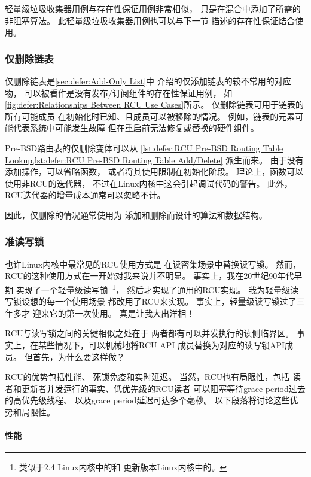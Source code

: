 轻量级垃圾收集器用例与存在性保证用例非常相似，
只是在混合中添加了所需的非阻塞算法。
此轻量级垃圾收集器用例也可以与下一节
描述的存在性保证结合使用。

\subsubsection{仅删除链表}
\label{sec:defer:Delete-Only List}

仅删除链表是\cref{sec:defer:Add-Only List}中
介绍的仅添加链表的较不常用的对应物，
可以被看作是没有发布/订阅组件的存在性保证用例，
如\cref{fig:defer:Relationships Between RCU Use Cases}所示。
仅删除链表可用于链表的所有可能成员
在初始化时已知、且成员可以被移除的情况。
例如，链表的元素可能代表系统中可能发生故障
但在重启前无法修复或替换的硬件组件。

Pre-BSD路由表的仅删除变体可以从
\cref{lst:defer:RCU Pre-BSD Routing Table Lookup,lst:defer:RCU Pre-BSD Routing Table Add/Delete}
派生而来。
由于没有添加操作，可以省略函数，
或者将其使用限制在初始化阶段。
理论上，函数可以使用非RCU的迭代器，
不过在Linux内核中这会引起调试代码的警告。
此外，RCU迭代器的增量成本通常可以忽略不计。

因此，仅删除的情况通常使用为
添加和删除而设计的算法和数据结构。

\subsubsection{准读写锁}
\label{sec:defer:Quasi Reader-Writer Lock}

也许Linux内核中最常见的RCU使用方式是
在读密集场景中替换读写锁。
然而，RCU的这种使用方式在一开始对我来说并不明显。
事实上，我在20世纪90年代早期
实现了一个轻量级读写锁~\cite{WilsonCHsieh92a}\footnote{
	类似于2.4 Linux内核中的和
	更新版本Linux内核中的。}，
然后才实现了通用的RCU实现。
我为轻量级读写锁设想的每一个使用场景
都改用了RCU来实现。
事实上，轻量级读写锁过了三年多才
迎来它的第一次使用。
真是让我大出洋相！

RCU与读写锁之间的关键相似之处在于
两者都有可以并发执行的读侧临界区。
事实上，在某些情况下，可以机械地将RCU API
成员替换为对应的读写锁API成员。
但首先，为什么要这样做？

RCU的优势包括性能、
死锁免疫和实时延迟。
当然，RCU也有局限性，包括
读者和更新者并发运行的事实、低优先级的RCU读者
可以阻塞等待grace period过去的高优先级线程、
以及grace period延迟可达多个毫秒。
以下段落将讨论这些优势和局限性。

\paragraph{性能}

